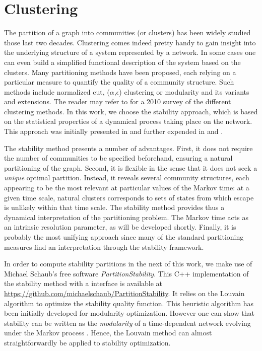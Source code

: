\chapter{Clustering} \label{chap:clustering}
The partition of a graph into communities (or clusters) has been widely studied those last two decades. Clustering comes indeed pretty handy to gain insight into the underlying structure of a system represented by a network. In some cases one can even build a simplified functional description of the system based on the clusters. Many partitioning methods have been proposed, each relying on a particular measure to quantify the quality of a community structure. Such methods include normalized cut, ($\alpha$,$\epsilon$) clustering or modularity and its variants and extensions. The reader may refer to \cite{fortunato2010community} for a 2010 survey of the different clustering methods. In this work, we choose the stability approach, which is based on the statistical properties of a dynamical process taking place on the network. This approach was initially presented in \cite{delvenne2010stability} and further expended in \cite{lambiotte2009laplacian} and \cite{delvenne2013stability}. 

The stability method presents a number of advantages. First, it does not require the number of communities to be specified beforehand, ensuring a natural partitioning of the graph. Second, it is flexible in the sense that it does not seek a \textit{unique} optimal partition. Instead, it reveals several community structures, each appearing to be the most relevant at particular values of the Markov time: at a given time scale, natural clusters corresponds to sets of states from which escape is unlikely within that time scale. The stability method provides thus a dynamical interpretation of the partitioning problem. The Markov time acts as an intrinsic resolution parameter, as will be developed shortly. Finally, it is probably the most unifying approach since many of the standard partitioning measures find an interpretation through the stability framework.

In order to compute stability partitions in the next of this work, we make use of Michael Schaub's free software \textit{PartitionStability}. This C++ implementation of the stability method with a \matlab interface is available at \url{https://github.com/michaelschaub/PartitionStability}. It relies on the Louvain algorithm \cite{blondel2008fast} to optimize the stability quality function. This heuristic algorithm has been initially developed for modularity optimization. However one can show that stability can be written as the \textit{modularity} of a time-dependent network evolving under the Markov process \cite{lambiotte2009laplacian}. Hence, the Louvain method can almost straightforwardly be applied to stability optimization.

